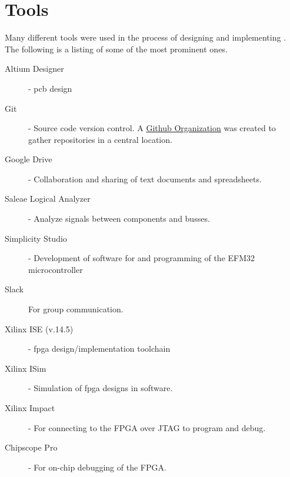\chapter{Tools}

Many different tools were used in the process of designing and implementing \vthreek.
The following is a listing of some of the most prominent ones.

\begin{description}
    \item[Altium Designer] - \gls{pcb} design
    \item[Git] - Source code version control. A \href{https://github.com/DMPRO-2015-vector-graphics}{Github Organization} was created to gather repositories in a central location.
    \item[Google Drive] - Collaboration and sharing of text documents and spreadsheets.
    \item[Saleae Logical Analyzer] - Analyze signals between components and busses.
    \item[Simplicity Studio] - Development of software for and programming of the EFM32 microcontroller
    \item[Slack] For group communication.
    \item[Xilinx ISE (v.14.5)] - \gls{fpga} design/implementation toolchain
    \item[Xilinx ISim] - Simulation of \gls{fpga} designs in software.
    \item[Xilinx Impact] - For connecting to the FPGA over JTAG to program and debug.
    \item[Chipscope Pro] - For on-chip debugging of the FPGA.
\end{description}
